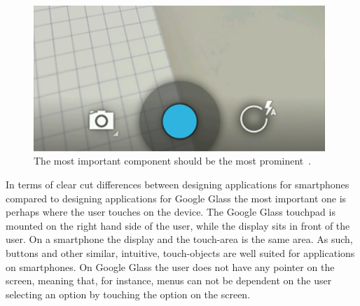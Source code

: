 	\begin{figure}[ht!]
		\centering
		\includegraphics[width=110mm]{images/principles_make_important_fast}
		\caption{The most important component should be the most prominent~\cite{androidDesignPrinciples}.}
		\label{smartphonePrincinples2}
	\end{figure}




In terms of clear cut differences between designing applications for smartphones compared to designing applications for Google Glass the most important one is perhaps where the user touches on the device. The Google Glass touchpad is mounted on the right hand side of the user, while the display sits in front of the user. On a smartphone the display and the touch-area is the same area. As such, buttons and other similar, intuitive, touch-objects are well suited for applications on smartphones. On Google Glass the user does not have any pointer on the screen, meaning that, for instance, menus can not be dependent on the user selecting an option by touching the option on the screen.

